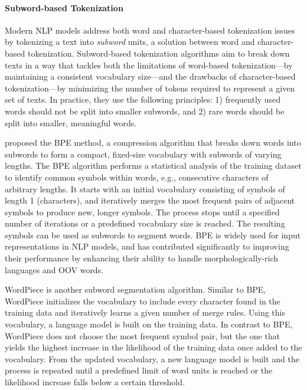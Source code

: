 \paragraph{Subword-based Tokenization} Modern \ac{NLP} models address both word and character-based tokenization issues by tokenizing a text into \textit{subword} units, a solution between word and character-based tokenization. Subword-based tokenization algorithms aim to break down texts in a way that tackles both the limitations of word-based tokenization—by maintaining a consistent vocabulary size—and the drawbacks of character-based tokenization—by minimizing the number of tokens required to represent a given set of texts. In practice, they use the following principles: 1) frequently used words should not be split into smaller subwords, and 2) rare words should be split into smaller, meaningful words. 

\citet{gage1994new} proposed the \ac{BPE} method, a compression algorithm that breaks down words into subwords to form a compact, fixed-size vocabulary with subwords of varying lengths. The \ac{BPE} algorithm performs a statistical analysis of the training dataset to identify common symbols within words, e.g., consecutive characters of arbitrary lengths. It starts with an initial vocabulary consisting of symbols of length 1 (characters), and iteratively merges the most frequent pairs of adjacent symbols to produce new, longer symbols. The process stops until a specified number of iterations or a predefined vocabulary size is reached. The resulting symbols can be used as subwords to segment words. \ac{BPE} is widely used for input representations in \ac{NLP} models, and has contributed significantly to improving their performance by enhancing their ability to handle morphologically-rich languages and \ac{OOV} words.

WordPiece \citep{wu2016google} is another subword segmentation algorithm. Similar to \ac{BPE}, WordPiece initializes the vocabulary to include every character found in the training data and iteratively learns a given number of merge rules. Using this vocabulary, a language model is built on the training data. In contrast to \ac{BPE}, WordPiece does not choose the most frequent symbol pair, but the one that yields the highest increase in the likelihood of the training data once added to the vocabulary. From the updated vocabulary, a new language model is built and the process is repeated until a predefined limit of word units is reached or the likelihood increase falls below a certain threshold. 


